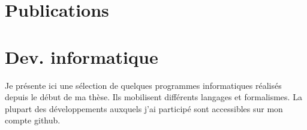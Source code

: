 \documentclass[]{cv-etienne}
\begin{document}
\section{Publications}
\begin{refsection}
  \nocite{*}
  \printbibliography[type=article,title={Articles dans des revues à comité de lecture},heading=subbibliography,sorting=ynt]
  \nocite{*}
  \printbibliography[type=incollection,title={Chapitres de livre},heading=subbibliography,sorting=ynt]
  \nocite{*}
  \printbibliography[type=inproceedings,title={Conférences/posters},heading=subbibliography,sorting=ynt]
\end{refsection}
\section{Dev. informatique}
Je présente ici une sélection de quelques programmes informatiques réalisés depuis le début de ma thèse. Ils mobilisent différents langages et formalismes. La plupart des développements auxquels j'ai participé sont accessibles sur mon compte github.
\end{document}
